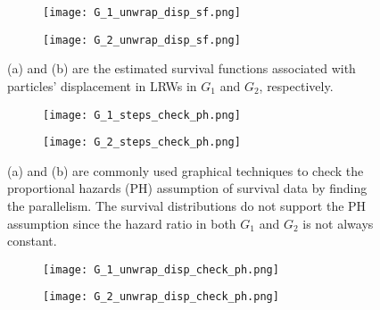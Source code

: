   \begin{figure}
        \centering
        \begin{subfigure}[b]{0.45\textwidth}
          \texttt{[image: G\_1\_unwrap\_disp\_sf.png]}
          \caption{}
          \label{fig:sf_g1_branch_disp}
        \end{subfigure}
        \hfill
        \begin{subfigure}[b]{0.45\textwidth}
          \texttt{[image: G\_2\_unwrap\_disp\_sf.png]}
          \caption{}
          \label{fig:sf_g2_branch_disp}
        \end{subfigure}
        \caption{(a) and (b) are the estimated survival functions
          associated with particles' displacement in LRWs in $G_1$ and
          $G_2$, respectively.}
        \label{fig:sf_branch_disp}
  \end{figure}


  \begin{figure}
        \centering
        \begin{subfigure}[b]{0.45\textwidth}
          \texttt{[image: G\_1\_steps\_check\_ph.png]}
          \caption{}
          \label{fig:g1_steps_check_ph}
        \end{subfigure}
        \hfill
        \begin{subfigure}[b]{0.45\textwidth}
          \texttt{[image: G\_2\_steps\_check\_ph.png]}
          \caption{}
          \label{fig:g1_steps_check_ph}
        \end{subfigure}
        \caption{(a) and (b) are commonly used graphical techniques to
          check the proportional hazards (PH) assumption of survival data
          by finding the parallelism. The survival distributions do
          not support the PH assumption since the
          hazard ratio in both $G_1$ and $G_2$ is not always constant.}
        \label{fig:branch_steps_check_ph}
  \end{figure}


  \begin{figure}
        \centering
        \begin{subfigure}[b]{0.45\textwidth}
          \texttt{[image: G\_1\_unwrap\_disp\_check\_ph.png]}
          \caption{}
          \label{fig:g1_disp_check_ph}
        \end{subfigure}
        \hfill
        \begin{subfigure}[b]{0.45\textwidth}
          \texttt{[image: G\_2\_unwrap\_disp\_check\_ph.png]}
          \caption{}
          \label{fig:g1_disp_check_ph}
        \end{subfigure}
        \caption{}
        \label{fig:branch_disp_check_ph}
      \end{figure}




